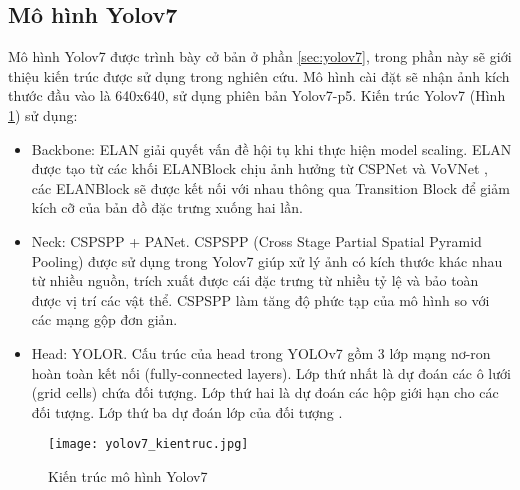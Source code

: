 \documentclass[../the.tex]{subfiles}
\begin{document}
\subsection{Mô hình Yolov7}
{\fontsize{13}{12} \selectfont  
Mô hình Yolov7 được trình bày cở bản ở phần \ref{sec:yolov7}, trong phần này sẽ giới thiệu kiến trúc được sử dụng trong nghiên cứu. Mô hình cài đặt sẽ nhận ảnh kích thước đầu vào là 640x640, sử dụng phiên bản Yolov7-p5. Kiến trúc Yolov7 (Hình \ref{fig:yolov7_kientruc}) sử dụng:
\begin{itemize}
	\item Backbone: ELAN giải quyết vấn đề hội tụ khi thực hiện model scaling. ELAN được tạo từ các khối ELANBlock chịu ảnh hưởng từ CSPNet \cite{wang2019cspnet} và VoVNet \cite{lee2019energy}, các ELANBlock sẽ được kết nối với nhau thông qua Transition Block để giảm kích cỡ của bản đồ đặc trưng xuống hai lần.
	\item Neck: CSPSPP + PANet. CSPSPP (Cross Stage Partial Spatial Pyramid Pooling) được sử dụng trong Yolov7 giúp xử lý ảnh có kích thước khác nhau từ nhiều nguồn, trích xuất được cái đặc trưng từ nhiều tỷ lệ và bảo toàn được vị trí các vật thể. CSPSPP làm tăng độ phức tạp của mô hình so với các mạng gộp đơn giản.
	\item Head: YOLOR. Cấu trúc của head trong YOLOv7
	gồm 3 lớp mạng nơ-ron hoàn toàn kết nối
	(fully-connected layers). Lớp thứ nhất
	là dự đoán các ô lưới (grid cells) chứa đối
	tượng. Lớp thứ hai là dự đoán các hộp giới hạn cho các đối tượng. Lớp thứ ba dự đoán lớp của đối tượng \cite{cachuayol7}.
\end{itemize}
\bigskip
}
\begin{figure}[H]
	\centering
	\texttt{[image: yolov7\_kientruc.jpg]}
	\caption{Kiến trúc mô hình Yolov7}
	\label{fig:yolov7_kientruc}
\end{figure}
\end{document}
